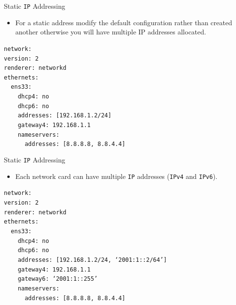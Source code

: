 \documentclass{beamer}
\begin{document}
\begin{frame}{Static \texttt{IP} Addressing}
  \begin{itemize}
    \item For a static address modify the default configuration rather than created another otherwise you will have multiple IP addresses allocated.
  \end{itemize}
  \begin{center}
    \begin{minipage}{9cm}
      \begin{block}{}
        \texttt{network:\\
        version: 2\\
        renderer: networkd\\
        ethernets:\\
        ~~ens33:\\
        ~~~~dhcp4: no\\
        ~~~~dhcp6: no\\
        ~~~~addresses: [192.168.1.2/24]\\
        ~~~~gateway4: 192.168.1.1\\
        ~~~~nameservers:\\
        ~~~~~~addresses: [8.8.8.8, 8.8.4.4]}
      \end{block}
    \end{minipage}
  \end{center}
\end{frame}

\begin{frame}{Static \texttt{IP} Addressing}
  \begin{itemize}
    \item Each network card can have multiple \texttt{IP} addresses (\texttt{IPv4} and \texttt{IPv6}).
  \end{itemize}
  \begin{center}
    \begin{minipage}{9cm}
      \begin{block}{}
        \texttt{network:\\
        version: 2\\
        renderer: networkd\\
        ethernets:\\
        ~~ens33:\\
        ~~~~dhcp4: no\\
        ~~~~dhcp6: no\\
        ~~~~addresses: [192.168.1.2/24, `2001:1::2/64']\\
        ~~~~gateway4: 192.168.1.1\\
        ~~~~gateway6: `2001:1::255'\\
        ~~~~nameservers:\\
        ~~~~~~addresses: [8.8.8.8, 8.8.4.4]}
      \end{block}
    \end{minipage}
  \end{center}
\end{frame}
\end{document}
